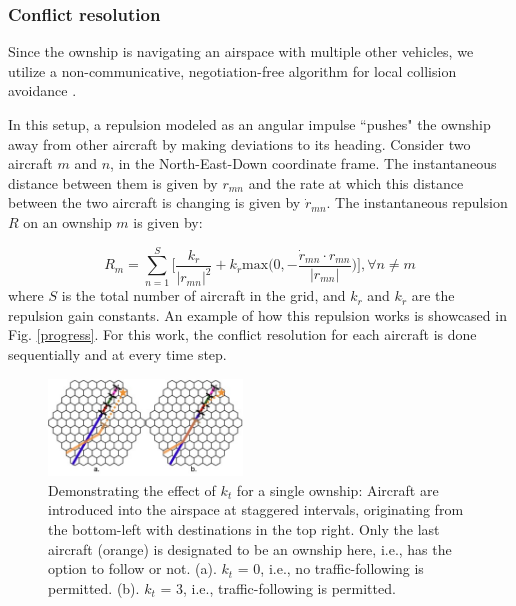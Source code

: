 \documentclass[conference, letter]{IEEEtran}
\begin{document}
\subsubsection*{Conflict resolution}
Since the ownship is navigating an airspace with multiple other vehicles, we utilize a non-communicative, negotiation-free algorithm for local collision avoidance \cite{b11}. 

In this setup, a repulsion modeled as an angular impulse ``pushes" the ownship away from other aircraft by making deviations to its heading. Consider two aircraft $m$ and $n$, in the North-East-Down coordinate frame. The instantaneous distance between them is given by ${r}_{mn}$ and the rate at which this distance between the two aircraft is changing is given by $\dot{r}_{mn}$. The instantaneous repulsion $R$ on an ownship $m$ is given by:

\begin{equation}
\label{gamma}
{R}_{m} = \sum_{n=1}^S  
\Bigg[ \frac{k_r}{|{r}_{mn}|^2} + 
k_{\dot{r}}\text{max}\Bigg(0, -\frac{\dot{r}_{mn} \cdot{r}_{mn}} {|{r}_{mn}|} \Bigg) \Bigg], \forall n \neq m
\end{equation} 
where $S$ is the total number of aircraft in the grid, and $k_r$ and $k_{\dot{r}}$ are the repulsion gain constants. An example of how this repulsion works is showcased in Fig. \ref{progress}. For this work, the conflict resolution for each aircraft is done sequentially and at every time step.


\begin{figure}[hbt!]
\centering
\includegraphics[width=0.46\textwidth]{following_vs_not.jpg}
\caption{Demonstrating the effect of $k_t$ for a single ownship: Aircraft are introduced into the airspace at staggered intervals, originating from the bottom-left with destinations in the top right. Only the last aircraft (orange) is designated to be an ownship here, i.e., has the option to follow or not. (a). $k_t$ = 0, i.e., no traffic-following is permitted. (b). $k_t$ = 3, i.e., traffic-following is permitted.}
\label{following_single_ownship}
\end{figure}
\end{document}
